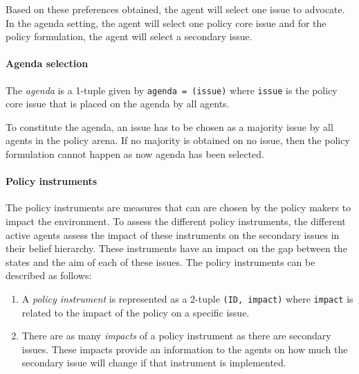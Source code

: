 \documentclass[11pt]{article}
\begin{document}
Based on these preferences obtained, the agent will select one issue to advocate. In the agenda setting, the agent will select one policy core issue and for the policy formulation, the agent will select a secondary issue.


\paragraph{Agenda selection}

The \emph{agenda} is a 1-tuple given by \texttt{agenda = (issue)} where \texttt{issue} is the policy core issue that is placed on the agenda by all agents.

To constitute the agenda, an issue has to be chosen as a majority issue by all agents in the policy arena. If no majority is obtained on no issue, then the policy formulation cannot happen as now agenda has been selected.


\paragraph{Policy instruments}

The policy instruments are measures that can are chosen by the policy makers to impact the environment. To assess the different policy instruments, the different active agents assess the impact of these instruments on the secondary issues in their belief hierarchy. These instruments have an impact on the gap between the states and the aim of each of these issues. The policy instruments can be described as follows:

\begin{enumerate}
\item A \emph{policy instrument} is represented as a 2-tuple \texttt{(ID, impact)} where \texttt{impact} is related to the impact of the policy on a specific issue.

\item There are as many \emph{impacts} of a policy instrument as there are secondary issues. These impacts provide an information to the agents on how much the secondary issue will change if that instrument is implemented.

\end{enumerate}

\end{document}
